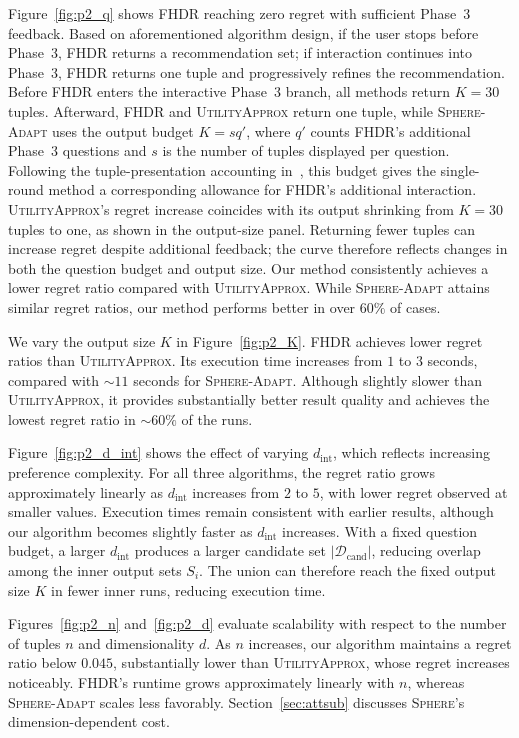 \documentclass[conference]{IEEEtran}
\theoremstyle{definition}
\theoremstyle{plain}
\begin{document}
Figure~\ref{fig:p2_q} shows FHDR reaching zero regret with sufficient Phase~3 feedback. Based on aforementioned algorithm design, if the user stops before Phase~3, FHDR returns a recommendation set; if interaction continues into Phase~3, FHDR returns one tuple and progressively refines the recommendation. Before FHDR enters the interactive Phase~3 branch, all methods return $K=30$ tuples. Afterward, FHDR and \textsc{UtilityApprox} return one tuple, while \textsc{Sphere-Adapt} uses the output budget $K=sq'$, where $q'$ counts FHDR’s additional Phase~3 questions and $s$ is the number of tuples displayed per question. Following the tuple-presentation accounting in~\cite{XCL19}, this budget gives the single-round method a corresponding allowance for FHDR’s additional interaction. \textsc{UtilityApprox}'s regret increase coincides with its output shrinking from $K=30$ tuples to one, as shown in the output-size panel. Returning fewer tuples can increase regret despite additional feedback; the curve therefore reflects changes in both the question budget and output size. Our method consistently achieves a lower regret ratio compared with \textsc{UtilityApprox}. While \textsc{Sphere-Adapt} attains similar regret ratios, our method performs better in over $60\%$ of cases.

We vary the output size $K$ in Figure~\ref{fig:p2_K}. FHDR achieves lower regret ratios than \textsc{UtilityApprox}. Its execution time increases from $1$ to $3$ seconds, compared with $\sim11$ seconds for \textsc{Sphere-Adapt}. Although slightly slower than \textsc{UtilityApprox}, it provides substantially better result quality and achieves the lowest regret ratio in $\sim60\%$ of the runs.

Figure~\ref{fig:p2_d_int} shows the effect of varying $d_\text{int}$, which reflects increasing preference complexity. For all three algorithms, the regret ratio grows approximately linearly as $d_\text{int}$ increases from $2$ to $5$, with lower regret observed at smaller values. Execution times remain consistent with earlier results, although our algorithm becomes slightly faster as $d_\text{int}$ increases. With a fixed question budget, a larger $d_\text{int}$ produces a larger candidate set $|\mathcal{D}_\text{cand}|$, reducing overlap among the inner output sets $S_i$. The union can therefore reach the fixed output size $K$ in fewer inner runs, reducing execution time.

Figures~\ref{fig:p2_n} and~\ref{fig:p2_d} evaluate scalability with respect to the number of tuples $n$ and dimensionality $d$. As $n$ increases, our algorithm maintains a regret ratio below $0.045$, substantially lower than \textsc{UtilityApprox}, whose regret increases noticeably. FHDR's runtime grows approximately linearly with $n$, whereas \textsc{Sphere-Adapt} scales less favorably. Section~\ref{sec:attsub} discusses \textsc{Sphere}'s dimension-dependent cost.
\end{document}
